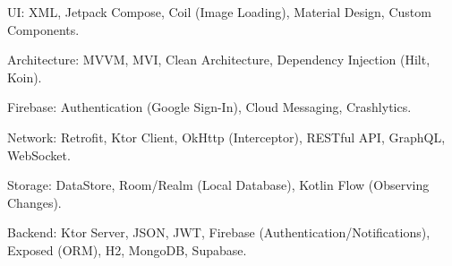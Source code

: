 \begin{cvparagraph}

    UI: XML, Jetpack Compose, Coil (Image Loading), Material Design, Custom Components.

    Architecture: MVVM, MVI, Clean Architecture, Dependency Injection (Hilt, Koin).

    Firebase: Authentication (Google Sign-In), Cloud Messaging, Crashlytics.

    Network: Retrofit, Ktor Client, OkHttp (Interceptor), RESTful API, GraphQL, WebSocket.

    Storage: DataStore, Room/Realm (Local Database), Kotlin Flow (Observing Changes).

    Backend: Ktor Server, JSON, JWT, Firebase (Authentication/Notifications), Exposed (ORM), H2, MongoDB, Supabase.
\end{cvparagraph}

